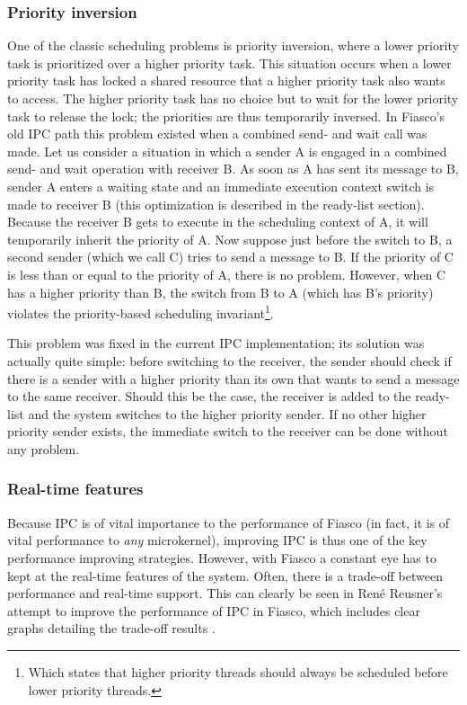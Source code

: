 \subsubsection{Priority inversion}
One of the classic scheduling problems is priority inversion, where a lower priority task is prioritized over a higher priority task. This situation occurs when a lower priority task has locked a shared resource that a higher priority task also wants to access. The higher priority task has no choice but to wait for the lower priority task to release the lock; the priorities are thus temporarily inversed. In Fiasco's old IPC path this problem existed when a combined send- and wait call was made. Let us consider a situation in which a sender A is engaged in a combined send- and wait operation with receiver B. As soon as A has sent its message to B, sender A enters a waiting state and an immediate execution context switch is made to receiver B (this optimization is described in the ready-list section). Because the receiver B gets to execute in the scheduling context of A, it will temporarily inherit the priority of A. Now suppose just before the switch to B, a second sender (which we call C) tries to send a message to B. If the priority of C is less than or equal to the priority of A, there is no problem. However, when C has a higher priority than B, the switch from B to A (which has B's priority) violates the priority-based scheduling invariant\footnote{Which states that higher priority threads should always be scheduled before lower priority threads.}.\emptyline

This problem was fixed in the current IPC implementation; its solution was actually quite simple: before switching to the receiver, the sender should check if there is a sender with a higher priority than its own that wants to send a message to the same receiver. Should this be the case, the receiver is added to the ready-list and the system switches to the higher priority sender. If no other higher priority sender exists, the immediate switch to the receiver can be done without any problem.

\subsubsection{Real-time features}
Because IPC is of vital importance to the performance of Fiasco (in fact, it is of vital performance to \textit{any} microkernel), improving IPC is thus one of the key performance improving strategies. However, with Fiasco a constant eye has to kept at the real-time features of the system. Often, there is a trade-off between performance and real-time support. This can clearly be seen in Ren\'e Reusner's attempt to improve the performance of IPC in Fiasco, which includes clear graphs detailing the trade-off results \cite{reusner05impl}.\emptyline

